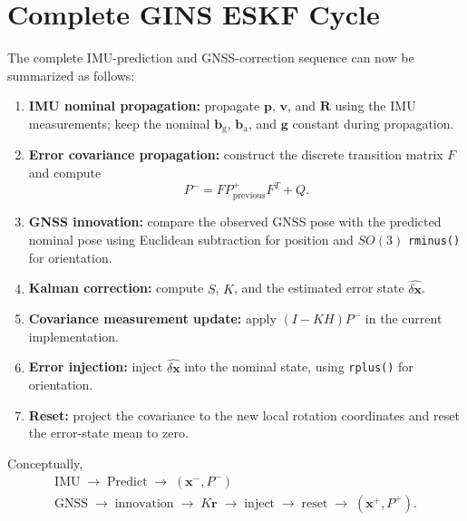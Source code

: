 \documentclass[11pt]{article}
\newcommand{\R}{\mathbf{R}}
\newcommand{\p}{\mathbf{p}}
\newcommand{\vct}{\mathbf{v}}
\newcommand{\bg}{\mathbf{b}_{\mathrm{g}}}
\newcommand{\ba}{\mathbf{b}_{\mathrm{a}}}
\newcommand{\g}{\mathbf{g}}
\begin{document}
\section{Complete GINS ESKF Cycle}
The complete IMU-prediction and GNSS-correction sequence can now be summarized as follows:
\begin{enumerate}
    \item \textbf{IMU nominal propagation:} propagate $\p$, $\vct$, and $\R$ using the IMU measurements; keep the nominal $\bg$, $\ba$, and $\g$ constant during propagation.
    \item \textbf{Error covariance propagation:} construct the discrete transition matrix $F$ and compute
    \begin{equation}
    P^{-}=F P^{+}_{\mathrm{previous}}F^{T}+Q.
    \end{equation}
    \item \textbf{GNSS innovation:} compare the observed GNSS pose with the predicted nominal pose using Euclidean subtraction for position and $SO(3)$ \texttt{rminus()} for orientation.
    \item \textbf{Kalman correction:} compute $S$, $K$, and the estimated error state $\widehat{\delta\bm x}$.
    \item \textbf{Covariance measurement update:} apply $(I-KH)P^{-}$ in the current implementation.
    \item \textbf{Error injection:} inject $\widehat{\delta\bm x}$ into the nominal state, using \texttt{rplus()} for orientation.
    \item \textbf{Reset:} project the covariance to the new local rotation coordinates and reset the error-state mean to zero.
\end{enumerate}

Conceptually,
\begin{equation}
\boxed{
\begin{array}{c}
\text{IMU}\;\longrightarrow\;\text{Predict}\;\longrightarrow\;(\bm x^{-},P^{-})\\[1mm]
\text{GNSS}\;\longrightarrow\;\text{innovation}\;\longrightarrow\;K\bm r
\;\longrightarrow\;\text{inject}\;\longrightarrow\;\text{reset}
\;\longrightarrow\;(\bm x^{+},P^{+}).
\end{array}
}
\end{equation}
\end{document}
